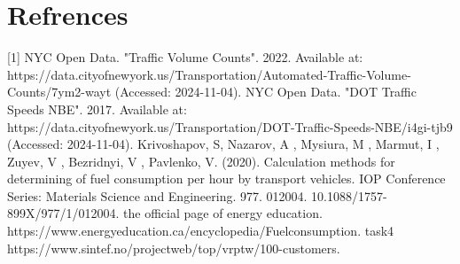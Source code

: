 \section{Refrences}
[1] NYC Open Data. "Traffic Volume Counts". 2022. Available at:
\newline
https://data.cityofnewyork.us/Transportation/Automated-Traffic-Volume-Counts/7ym2-wayt (Accessed: 2024-11-04).
\newline
[2] NYC Open Data. "DOT Traffic Speeds NBE". 2017. Available at: 
\newline
https://data.cityofnewyork.us/Transportation/DOT-Traffic-Speeds-NBE/i4gi-tjb9 (Accessed: 2024-11-04).
\newline
[3]Krivoshapov, S,  Nazarov, A ,  Mysiura, M , Marmut, I , Zuyev, V , Bezridnyi, V , Pavlenko, V. (2020). Calculation methods for determining of fuel consumption per hour by transport vehicles. IOP Conference Series: Materials Science and Engineering. 977. 012004. 10.1088/1757-899X/977/1/012004. 
\newline
[4] the official page of energy education. 
\newline
https://www.energyeducation.ca/encyclopedia/Fuelconsumption.
\newline
[10] task4
https://www.sintef.no/projectweb/top/vrptw/100-customers.

